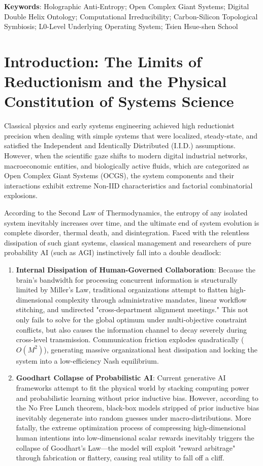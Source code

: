 \documentclass[11pt,a4paper]{article}
\begin{document}
\textbf{Keywords}: Holographic Anti-Entropy; Open Complex Giant Systems; Digital Double Helix Ontology; Computational Irreducibility; Carbon-Silicon Topological Symbiosis; L0-Level Underlying Operating System; Tsien Hsue-shen School

\newpage

\section{Introduction: The Limits of Reductionism and the Physical Constitution of Systems Science}

Classical physics and early systems engineering achieved high reductionist precision when dealing with simple systems that were localized, steady-state, and satisfied the Independent and Identically Distributed (I.I.D.) assumptions. However, when the scientific gaze shifts to modern digital industrial networks, macroeconomic entities, and biologically active fluids, which are categorized as Open Complex Giant Systems (OCGS), the system components and their interactions exhibit extreme Non-IID characteristics and factorial combinatorial explosions.

According to the Second Law of Thermodynamics, the entropy of any isolated system inevitably increases over time, and the ultimate end of system evolution is complete disorder, thermal death, and disintegration. Faced with the relentless dissipation of such giant systems, classical management and researchers of pure probability AI (such as AGI) instinctively fall into a double deadlock:
\begin{enumerate}
    \item \textbf{Internal Dissipation of Human-Governed Collaboration}: Because the brain's bandwidth for processing concurrent information is structurally limited by Miller's Law, traditional organizations attempt to flatten high-dimensional complexity through administrative mandates, linear workflow stitching, and undirected "cross-department alignment meetings." This not only fails to solve for the global optimum under multi-objective constraint conflicts, but also causes the information channel to decay severely during cross-level transmission. Communication friction explodes quadratically ($O(M^2)$), generating massive organizational heat dissipation and locking the system into a low-efficiency Nash equilibrium.
    \item \textbf{Goodhart Collapse of Probabilistic AI}: Current generative AI frameworks attempt to fit the physical world by stacking computing power and probabilistic learning without prior inductive bias. However, according to the No Free Lunch theorem, black-box models stripped of prior inductive bias inevitably degenerate into random guesses under macro-distributions. More fatally, the extreme optimization process of compressing high-dimensional human intentions into low-dimensional scalar rewards inevitably triggers the collapse of Goodhart's Law—the model will exploit "reward arbitrage" through fabrication or flattery, causing real utility to fall off a cliff.
\end{enumerate}
\end{document}
